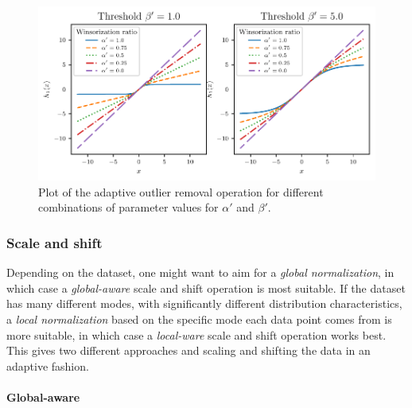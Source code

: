 \documentclass{statsmsc}
\begin{document}
\begin{figure}
\begin{center}
    \includegraphics[scale=1.0]{figures/adaptive_outlier_removal.pdf}
\end{center}
\caption{Plot of the adaptive outlier removal operation for different combinations of parameter 
values for $\alpha'$ and $\beta'$.}
\label{fig:adaptive_outlier}
\end{figure}



\subsubsection{Scale and shift}%
\label{ssub:Scale and shift}

Depending on the dataset, one might want to aim for a \textit{global
normalization}, in which case a \textit{global-aware} scale and shift operation is most
suitable. If the dataset has many different modes, with significantly different distribution characteristics, a \textit{local normalization} based on the specific mode each data point comes from is more suitable, in which case a \textit{local-ware} scale and shift
operation works best. This gives two different approaches and scaling and shifting the data in an adaptive fashion.

\paragraph{Global-aware}%
\label{par:Global-aware}
\end{document}

